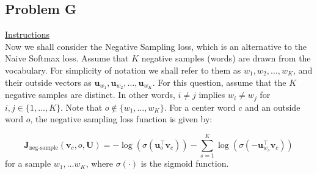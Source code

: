 \documentclass[12pt]{article}
\begin{document}
\subsection{Problem G}
\underline{Instructions}
~\\
Now we shall consider the Negative Sampling loss, which is an alternative to the Naive Softmax loss.  
Assume that $K$ negative samples (words) are drawn from the vocabulary. For simplicity of notation we 
shall refer to them as $w_1, w_2, \dots, w_K$, and their outside vectors as 
$\bm u_{w_1}, \bm u_{w_2}, \dots, \bm u_{w_K}$. For this question, assume that the $K$ negative samples 
are distinct. In other words, $i\neq j$ implies $w_i\neq w_j$ for $i,j\in\{1,\dots,K\}$.
Note that $o\notin\{w_1, \dots, w_K\}$. 
For a center word $c$ and an outside word $o$, the negative sampling loss function is given by:

\begin{equation*}
\bm J_{\text{neg-sample}}(\bm v_c, o, \bm U) = -\log(\sigma(\bm u_o^\top \bm v_c)) - \sum_{s=1}^K \log(\sigma(-\bm u_{w_s}^\top \bm v_c))
\end{equation*}
for a sample $w_1, \ldots w_K$, where $\sigma(\cdot)$ is the sigmoid function.
~\\
\end{document}
